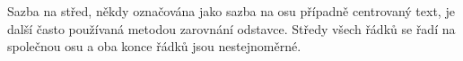 \begin{center}
Sazba na střed, někdy označována jako sazba na osu případně
centrovaný text, je další často používaná metodou zarovnání
odstavce. Středy všech řádků se řadí na společnou osu
a oba konce řádků jsou nestejnoměrné.
\end{center}